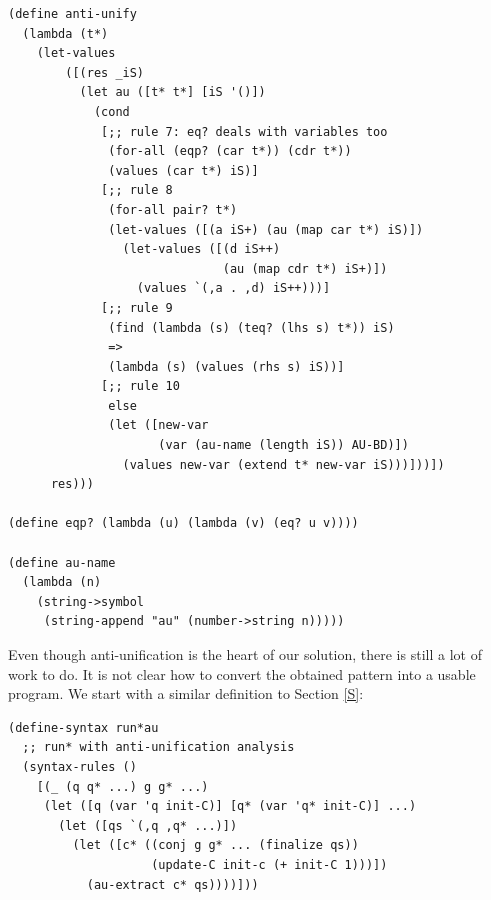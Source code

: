 \begin{lstlisting}
(define anti-unify
  (lambda (t*)
    (let-values
        ([(res _iS)
          (let au ([t* t*] [iS '()])
            (cond
             [;; rule 7: eq? deals with variables too
              (for-all (eqp? (car t*)) (cdr t*))
              (values (car t*) iS)]
             [;; rule 8
              (for-all pair? t*)
              (let-values ([(a iS+) (au (map car t*) iS)])
                (let-values ([(d iS++)
                              (au (map cdr t*) iS+)])
                  (values `(,a . ,d) iS++)))]
             [;; rule 9
              (find (lambda (s) (teq? (lhs s) t*)) iS)
              =>
              (lambda (s) (values (rhs s) iS))]
             [;; rule 10
              else
              (let ([new-var
                     (var (au-name (length iS)) AU-BD)])
                (values new-var (extend t* new-var iS)))]))])
      res)))

(define eqp? (lambda (u) (lambda (v) (eq? u v))))

(define au-name
  (lambda (n)
    (string->symbol
     (string-append "au" (number->string n)))))
\end{lstlisting}

Even though anti-unification is the heart of our solution, there is still a lot of work to do. It is not clear how to convert the obtained pattern into a usable program. We start with a similar definition to Section \ref{S}:
\begin{lstlisting}
(define-syntax run*au
  ;; run* with anti-unification analysis
  (syntax-rules ()
    [(_ (q q* ...) g g* ...)
     (let ([q (var 'q init-C)] [q* (var 'q* init-C)] ...)
       (let ([qs `(,q ,q* ...)])
         (let ([c* ((conj g g* ... (finalize qs))
                    (update-C init-c (+ init-C 1)))])
           (au-extract c* qs))))]))
\end{lstlisting}

